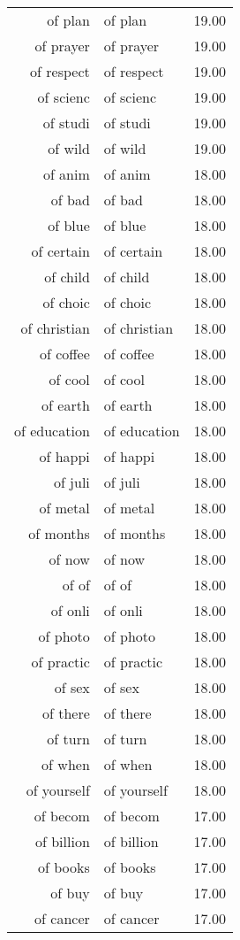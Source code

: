 \begin{table}[ht]
\begin{tabular}{rlr}
  of plan & of plan & 19.00 \\ 
  of prayer & of prayer & 19.00 \\ 
  of respect & of respect & 19.00 \\ 
  of scienc & of scienc & 19.00 \\ 
  of studi & of studi & 19.00 \\ 
  of wild & of wild & 19.00 \\ 
  of anim & of anim & 18.00 \\ 
  of bad & of bad & 18.00 \\ 
  of blue & of blue & 18.00 \\ 
  of certain & of certain & 18.00 \\ 
  of child & of child & 18.00 \\ 
  of choic & of choic & 18.00 \\ 
  of christian & of christian & 18.00 \\ 
  of coffee & of coffee & 18.00 \\ 
  of cool & of cool & 18.00 \\ 
  of earth & of earth & 18.00 \\ 
  of education & of education & 18.00 \\ 
  of happi & of happi & 18.00 \\ 
  of juli & of juli & 18.00 \\ 
  of metal & of metal & 18.00 \\ 
  of months & of months & 18.00 \\ 
  of now & of now & 18.00 \\ 
  of of & of of & 18.00 \\ 
  of onli & of onli & 18.00 \\ 
  of photo & of photo & 18.00 \\ 
  of practic & of practic & 18.00 \\ 
  of sex & of sex & 18.00 \\ 
  of there & of there & 18.00 \\ 
  of turn & of turn & 18.00 \\ 
  of when & of when & 18.00 \\ 
  of yourself & of yourself & 18.00 \\ 
  of becom & of becom & 17.00 \\ 
  of billion & of billion & 17.00 \\ 
  of books & of books & 17.00 \\ 
  of buy & of buy & 17.00 \\ 
  of cancer & of cancer & 17.00 \\ 

\end{tabular}
\end{table}
